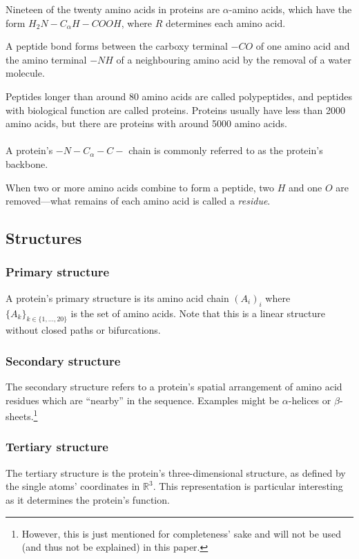 \documentclass[12pt]{article}
\theoremstyle{definition}\newtheorem*{definition}{Definition}
\theoremstyle{definition}\newtheorem*{remark}{Remark}
\begin{document}
Nineteen of the twenty amino acids in proteins are $\alpha$-amino acids, which have the form $H_2N - C_\alpha H - COOH$, where $R$ determines each amino acid.

A peptide bond forms between the carboxy terminal $-CO$ of one amino acid and the amino terminal $-NH$ of a neighbouring amino acid by the removal of a water molecule.

Peptides longer than around 80 amino acids are called polypeptides, and peptides with biological function are called proteins. Proteins usually have less than 2000 amino acids, but there are proteins with around 5000 amino acids.
\\~\\
A protein's $-N-C_\alpha-C-$ chain is commonly referred to as the protein's backbone.

When two or more amino acids combine to form a peptide, two $H$ and one $O$ are removed---what remains of each amino acid is called a \textit{residue}.

\subsection{Structures}
\subsubsection{Primary structure}\label{subsubsec:primary_structure}
A protein's primary structure is its amino acid chain $(A_i)_i$ where $\{A_k\}_{k\in\{1,\dots,20\}}$ is the set of amino acids. Note that this is a linear structure without closed paths or bifurcations.

\subsubsection{Secondary structure}
The secondary structure refers to a protein's spatial arrangement of amino acid residues which are ``nearby'' in the sequence. Examples might be $\alpha$-helices or $\beta$-sheets.\footnote{However, this is just mentioned for completeness' sake and will not be used (and thus not be explained) in this paper.}

\subsubsection{Tertiary structure}
The tertiary structure is the protein's three-dimensional structure, as defined by the single atoms' coordinates in $\mathbb R^3$. This representation is particular interesting as it determines the protein's function.
\end{document}

